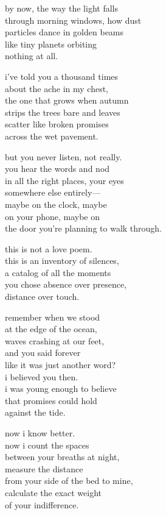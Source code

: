 \documentclass[
  10pt,
]{article}
\renewenvironment{quote}{\begin{leftbar}\small}{\end{leftbar}}
\begin{document}
\begin{quote}
by now, the way the light falls\\
through morning windows, how dust\\
particles dance in golden beams\\
like tiny planets orbiting\\
nothing at all.

i've told you a thousand times\\
about the ache in my chest,\\
the one that grows when autumn\\
strips the trees bare and leaves\\
scatter like broken promises\\
across the wet pavement.

but you never listen, not really.\\
you hear the words and nod\\
in all the right places, your eyes\\
somewhere else entirely---\\
maybe on the clock, maybe\\
on your phone, maybe on\\
the door you're planning to walk through.

this is not a love poem.\\
this is an inventory of silences,\\
a catalog of all the moments\\
you chose absence over presence,\\
distance over touch.

remember when we stood\\
at the edge of the ocean,\\
waves crashing at our feet,\\
and you said forever\\
like it was just another word?\\
i believed you then.\\
i was young enough to believe\\
that promises could hold\\
against the tide.

now i know better.\\
now i count the spaces\\
between your breaths at night,\\
measure the distance\\
from your side of the bed to mine,\\
calculate the exact weight\\
of your indifference.


\end{quote}
\end{document}
